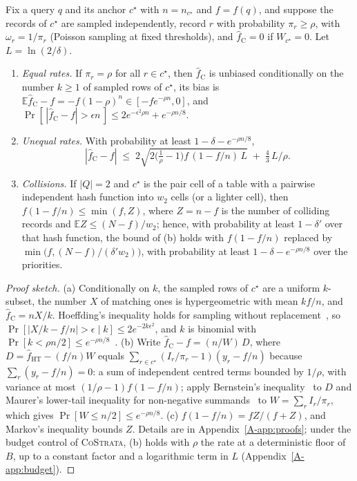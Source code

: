 \documentclass[sigconf]{acmart}
\newcommand{\cs}{\textsc{CoStrata}\xspace}
\newcommand{\E}{\mathbb{E}}
\newcommand{\apx}[1]{Appendix~\ref{A-#1}}
\begin{document}
\begin{theorem}\label{thm:calbound}
Fix a query $q$ and its anchor $c^\star$ with $n=n_{c^\star}$ and $f=f(q)$, and suppose the records of
$c^\star$ are sampled independently, record $r$ with probability $\pi_r\ge\rho$, with $\omega_r=1/\pi_r$
(Poisson sampling at fixed thresholds), and $\hat f_{\mathrm C}=0$ if $W_{c^\star}=0$. Let
$L=\ln(2/\delta)$.
\begin{enumerate}
\item[(a)] \emph{Equal rates.} If $\pi_r=\rho$ for all $r\in c^\star$, then $\hat f_{\mathrm C}$ is
unbiased conditionally on the number $k\ge1$ of sampled rows of $c^\star$, its bias is
$\E\hat f_{\mathrm C}-f=-f(1-\rho)^{n}\in[-fe^{-\rho n},0]$, and
$\Pr[\,|\hat f_{\mathrm C}-f|>\epsilon n\,]\le 2e^{-\epsilon^2\rho n}+e^{-\rho n/8}$.
\item[(b)] \emph{Unequal rates.} With probability at least $1-\delta-e^{-\rho n/8}$,
\[
  |\hat f_{\mathrm C}-f| \;\le\; 2\sqrt{2\bigl(\tfrac1\rho-1\bigr) f\,(1-f/n)\,L} \;+\; \tfrac43\,L/\rho .
\]
\item[(c)] \emph{Collisions.} If $|Q|=2$ and $c^\star$ is the pair cell of a table with a pairwise
independent hash function into $w_2$ cells (or a lighter cell), then $f(1-f/n)\le\min(f,Z)$, where $Z=n-f$ is the
number of colliding records and $\E Z\le(N-f)/w_2$; hence, with probability at least $1-\delta'$
over that hash function, the bound of (b) holds with $f(1-f/n)$ replaced by
$\min\bigl(f,(N-f)/(\delta' w_2)\bigr)$, with probability at least $1-\delta-e^{-\rho n/8}$ over the
priorities.
\end{enumerate}
\end{theorem}
\begin{proof}[Proof sketch]
(a) Conditionally on $k$, the sampled rows of $c^\star$ are a uniform $k$-subset, the number $X$ of
matching ones is hypergeometric with mean $kf/n$, and $\hat f_{\mathrm C}=nX/k$. Hoeffding's inequality
holds for sampling without replacement~\cite{hoeffding}, so $\Pr[|X/k-f/n|>\epsilon\mid k]\le
2e^{-2k\epsilon^2}$, and $k$ is binomial with $\Pr[k<\rho n/2]\le e^{-\rho n/8}$~\cite{mitzenmacher}.
(b) Write $\hat f_{\mathrm C}-f=(n/W)\,D$, where $D=\hat f_{\mathrm{HT}}-(f/n)W$ equals
$\sum_{r\in c^\star}(I_r/\pi_r-1)(y_r-f/n)$ because $\sum_r(y_r-f/n)=0$: a sum of independent centred terms
bounded by $1/\rho$, with variance at most $(1/\rho-1)f(1-f/n)$; apply Bernstein's inequality~\cite{concentration}
to $D$ and Maurer's lower-tail inequality for non-negative summands~\cite{maurer} to
$W=\sum_r I_r/\pi_r$, which gives $\Pr[W\le n/2]\le e^{-\rho n/8}$. (c) $f(1-f/n)=fZ/(f+Z)$, and
Markov's inequality bounds $Z$. Details are in \apx{app:proofs}; under the budget control of \cs,
(b) holds with $\rho$ the rate at a deterministic floor of $B$, up to a constant factor and a
logarithmic term in $L$ (\apx{app:budget}).
\end{proof}
\end{document}
